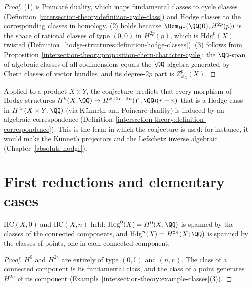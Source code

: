 \begin{proof}
(1) is Poincar\'e duality, which maps fundamental classes to cycle classes (Definition~\ref{intersection-theory:definition-cycle-class}) and Hodge classes to the corresponding classes in
homology. (2) holds because $\Hom_{\mathrm{HS}}(\QQ(0), H^{2p}(p))$ is the space of rational classes of type $(0,0)$ in $H^{2p}(p)$, which is $\mathrm{Hdg}^p(X)$ twisted
(Definition~\ref{hodge-structures:definition-hodge-classes}). (3) follows from Proposition~\ref{intersection-theory:proposition-chern-character-cycle}: the $\QQ$-span of algebraic classes of all
codimensions equals the $\QQ$-algebra generated by Chern classes of vector bundles, and its degree-$2p$ part is $Z^p_{\mathrm{alg}}(X)$.
\end{proof}

\begin{remark}\label{hodge-conjecture:remark-correspondence-form}
Applied to a product $X \times Y$, the conjecture predicts that every morphism of Hodge structures $H^k(X; \QQ) \to H^{k+2r-2n}(Y; \QQ)(r - n)$ that is a Hodge class in
$H^{2r}(X \times Y; \QQ)$ (via K\"unneth and Poincar\'e duality) is induced by an algebraic correspondence (Definition~\ref{intersection-theory:definition-correspondence}). This is the form in which
the conjecture is used: for instance, it would make the K\"unneth projectors and the Lefschetz inverse algebraic (Chapter~\ref{absolute-hodge}).
\end{remark}

\section{First reductions and elementary cases}\label{hodge-conjecture:section-reductions}

\begin{proposition}\label{hodge-conjecture:proposition-trivial-degrees}
$\mathrm{HC}(X, 0)$ and $\mathrm{HC}(X, n)$ hold: $\mathrm{Hdg}^0(X) = H^0(X; \QQ)$ is spanned by the classes of the connected components, and $\mathrm{Hdg}^n(X) = H^{2n}(X; \QQ)$ is spanned by the classes of
points, one in each connected component.
\end{proposition}

\begin{proof}
$H^0$ and $H^{2n}$ are entirely of type $(0,0)$ and $(n,n)$. The class of a connected component is its fundamental class, and the class of a point generates $H^{2n}$ of its component
(Example~\ref{intersection-theory:example-classes}(3)).
\end{proof}

